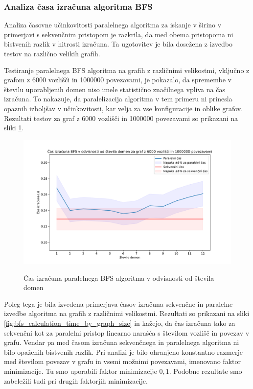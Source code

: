 \documentclass[mat1, tisk]{fmfdelo}
\begin{document}
\subsubsection{Analiza časa izračuna algoritma BFS}

Analiza časovne učinkovitosti paralelnega algoritma za iskanje v širino v primerjavi s sekvenčnim pristopom je
razkrila, da med obema pristopoma ni bistvenih razlik v hitrosti izračuna.
Ta ugotovitev je bila dosežena z izvedbo testov na različno velikih grafih.

Testiranje paralelnega BFS algoritma na grafih z različnimi velikostmi, vključno z grafom z 6000 vozlišči in 1000000 povezavami,
je pokazalo, da spremembe v številu uporabljenih domen niso imele statistično značilnega vpliva na čas izračuna.
To nakazuje, da paralelizacija algoritma v tem primeru ni prinesla opaznih izboljšav v učinkovitosti, kar velja za vse konfiguracije in oblike grafov.
Rezultati testov za graf z 6000 vozlišči in 1000000 povezavami so prikazani na sliki \ref{fig:bfs_calculation_time_by_num_domains}.

\begin{figure}[h!]
  \centering
  \caption{Čas izračuna paralelnega BFS algoritma v odvisnosti od števila domen}
  \includegraphics[width=15cm]{slike/bfs_v_odvisnosti_od_stevila_domen.pdf}
  \label{fig:bfs_calculation_time_by_num_domains}
\end{figure}

Poleg tega je bila izvedena primerjava časov izračuna sekvenčne in paralelne izvedbe algoritma na grafih z različnimi velikostmi.
Rezultati so prikazani na sliki \ref{fig:bfs_calculation_time_by_graph_size} in kažejo, da čas izračuna tako za sekvenčni kot za paralelni
pristop linearno narašča s številom vozlišč in povezav v grafu. Vendar pa med časom izračuna sekvenčnega in paralelnega algoritma
ni bilo opaženih bistvenih razlik. Pri analizi je bilo ohranjeno konstantno razmerje med številom povezav v grafu in vsemi
možnimi povezavami, imenovano faktor minimizacije. Tu smo uporabili faktor minimizacije $0,1$. Podobne rezultate smo zabeležili
tudi pri drugih faktorjih minimizacije.
\end{document}
